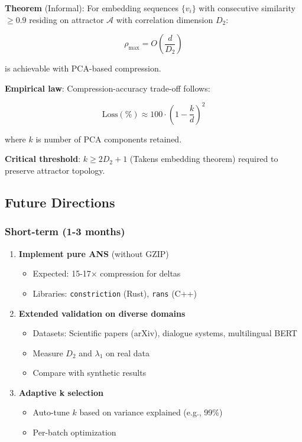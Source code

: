 \documentclass[11pt,a4paper]{article}
\begin{document}
\textbf{Theorem} (Informal): For embedding sequences $\{v_i\}$ with consecutive similarity $\geq 0.9$ residing on attractor $\mathcal{A}$ with correlation dimension $D_2$:

\begin{equation}
\rho_{\max} = O\left(\frac{d}{D_2}\right)
\end{equation}

is achievable with PCA-based compression.

\textbf{Empirical law}: Compression-accuracy trade-off follows:

\begin{equation}
\text{Loss}(\%) \approx 100 \cdot \left(1 - \frac{k}{d}\right)^2
\end{equation}

where $k$ is number of PCA components retained.

\textbf{Critical threshold}: $k \geq 2D_2 + 1$ (Takens embedding theorem) required to preserve attractor topology.

\subsection{Future Directions}

\subsubsection{Short-term (1-3 months)}

\begin{enumerate}
\item \textbf{Implement pure ANS} (without GZIP)
   \begin{itemize}
   \item Expected: 15-17$\times$ compression for deltas
   \item Libraries: \texttt{constriction} (Rust), \texttt{rans} (C++)
   \end{itemize}

\item \textbf{Extended validation on diverse domains}
   \begin{itemize}
   \item Datasets: Scientific papers (arXiv), dialogue systems, multilingual BERT
   \item Measure $D_2$ and $\lambda_1$ on real data
   \item Compare with synthetic results
   \end{itemize}

\item \textbf{Adaptive k selection}
   \begin{itemize}
   \item Auto-tune $k$ based on variance explained (e.g., 99\%)
   \item Per-batch optimization
   \end{itemize}
\end{enumerate}
\end{document}
